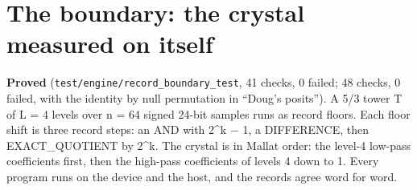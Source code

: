 \section{\texorpdfstring{The boundary: the crystal measured on itself}{The boundary: the crystal measured on itself}}

\textbf{Proved} (\texttt{test/\allowbreak{}engine/\allowbreak{}record\_\allowbreak{}boundary\_\allowbreak{}test}, 41 checks, 0 failed; 48 checks, 0 failed, with the identity by null permutation in “Doug's posits”). A 5/3 tower T of L = 4 levels over n = 64 signed 24-bit samples runs as record floors. Each floor shift is three record steps: an AND with 2\textasciicircum{}k − 1, a DIFFERENCE, then EXACT\_\allowbreak{}QUOTIENT by 2\textasciicircum{}k. The crystal is in Mallat order: the level-4 low-pass coefficients first, then the high-pass coefficients of levels 4 down to 1. Every program runs on the device and the host, and the records agree word for word.

